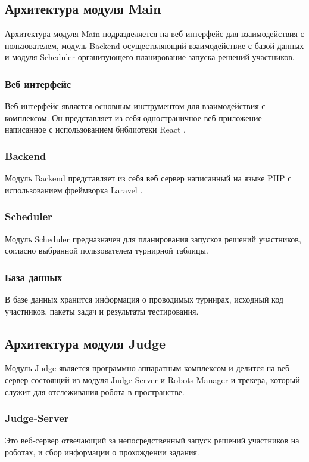 \documentclass[a4paper,12pt]{article}
\begin{document}
\subsection{Архитектура модуля Main}
Архитектура модуля Main подразделяется на веб-интерфейс для взаимодействия с пользователем, модуль Backend осуществляющий взаимодействие с базой данных и модуля Scheduler организующего планирование запуска решений участников.

\subsubsection{Веб интерфейс}
Веб-интерфейс является основным инструментом для взаимодействия с комплексом. Он представляет из себя одностраничное веб-приложение написанное с использованием библиотеки React \cite{web:react}. 

\subsubsection{Backend}
Модуль Backend представляет из себя веб сервер написанный на языке PHP с использованием фреймворка Laravel \cite{web:laravel}.

\subsubsection{Scheduler}
Модуль Scheduler предназначен для планирования запусков решений участников, согласно выбранной пользователем турнирной таблицы. 

\subsubsection{База данных}
В базе данных хранится информация о проводимых турнирах, исходный код участников, пакеты задач и результаты тестирования.

\subsection{Архитектура модуля Judge}
Модуль Judge является программно-аппаратным комплексом и делится на веб сервер состоящий из модуля Judge-Server и Robots-Manager и трекера, который служит для отслеживания робота в пространстве.

\subsubsection{Judge-Server}
Это веб-сервер отвечающий за непосредственный запуск решений участников на роботах, и сбор информации о прохождении задания. 
\end{document}
